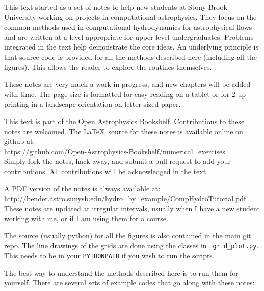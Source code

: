 
This text started as a set of notes to help new students at Stony
Brook University working on projects in computational astrophysics.
They focus on the common methods used in computational hydrodynamics
for astrophysical flows and are written at a level appropriate for
upper-level undergraduates.  Problems integrated in the text help
demonstrate the core ideas.  An underlying principle is that source
code is provided for all the methods described here (including all the
figures).  This allows the reader to explore the routines themselves.

These notes are very much a work in progress, and new chapters will be
added with time.  The page size is formatted for easy reading
on a tablet or for 2-up printing in a landscape orientation on
letter-sized paper.

This text is part of the Open Astrophysics Bookshelf.
Contributions to these notes are welcomed.  The \LaTeX\ source
for these notes is available online on github at: \\[0.25em]
%
\url{https://github.com/Open-Astrophysics-Bookshelf/numerical_exercises} \\[0.25em]
%
Simply fork the notes, hack away, and submit a pull-request to add
your contributions.  All contributions will be acknowledged in the text.


A PDF version of the notes is always available
at: \\[0.25em]
%
\url{http://bender.astro.sunysb.edu/hydro_by_example/CompHydroTutorial.pdf} \\[0.25em]
%
These notes are updated at irregular intervals, usually when I have a
new student working with me, or if I am using them for a course.

The source (usually python) for all the figures is also contained in
the main git repo.  The line drawings of the grids are done using the
classes in
\href{https://github.com/Open-Astrophysics-Bookshelf/numerical_exercises/blob/master/grid_plot.py}{{\tt
    grid\_plot.py}}.  This needs to be in your {\tt PYTHONPATH} if you
wish to run the scripts.

The best way to understand the methods described here is to run
them for yourself.  There are several sets of example codes that
go along with these notes:

